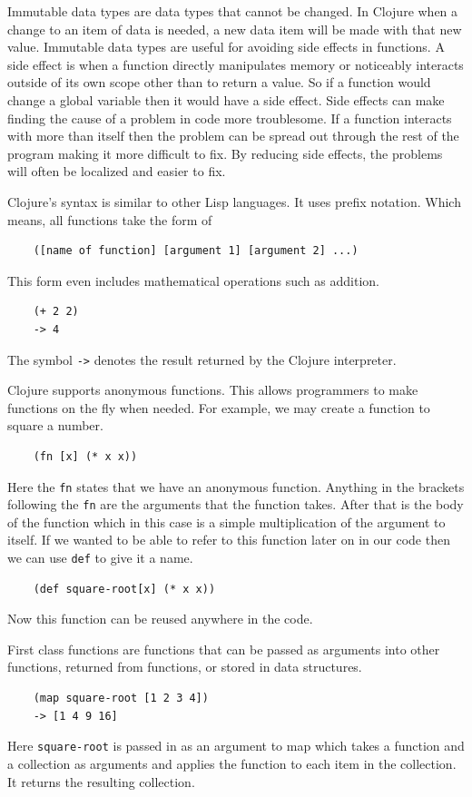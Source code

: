 \documentclass[12pt]{article}
\begin{document}
Immutable data types are data types that cannot be changed. In Clojure when a change to an item of data is needed, a new data item will be made with that new value. Immutable data types are useful for avoiding side effects in functions. A side effect is when a function directly manipulates memory or noticeably interacts outside of its own scope other than to return a value. So if a function would change a global variable then it would have a side effect. Side effects can make finding the cause of a problem in code more troublesome. If a function interacts with more than itself then the problem can be spread out through the rest of the program making it more difficult to fix. By reducing side effects, the problems will often be localized and easier to fix. 

Clojure's syntax is similar to other Lisp languages. It uses prefix notation. Which means, all functions take the form of
\begin{verbatim}
	([name of function] [argument 1] [argument 2] ...)
\end{verbatim}
This form even includes mathematical operations such as addition.
\begin{verbatim}
	(+ 2 2)
	-> 4
\end{verbatim}
The symbol \texttt{->} denotes the result returned by the Clojure interpreter.

Clojure supports anonymous functions. This allows programmers to make functions on the fly when needed. For example, we may create a function to square a number.
\begin{verbatim}
	(fn [x] (* x x))
\end{verbatim}
Here the \texttt{fn} states that we have an anonymous function. Anything in the brackets following the \texttt{fn} are the arguments that the function takes. After that is the body of the  function which in this case is a simple multiplication of the argument to itself. If we wanted to be able to refer to this function later on in our code then we can use \texttt{def} to give it a name.
\begin{verbatim}
	(def square-root[x] (* x x))
\end{verbatim}
Now this function can be reused anywhere in the code.

First class functions are functions that can be passed as arguments into other functions, returned from functions, or stored in data structures.
\begin{verbatim}
	(map square-root [1 2 3 4])
	-> [1 4 9 16]
\end{verbatim}
Here \texttt{square-root} is passed in as an argument to map which takes a function and a collection as arguments and applies the function to each item in the collection. It returns the resulting collection.
\end{document}
